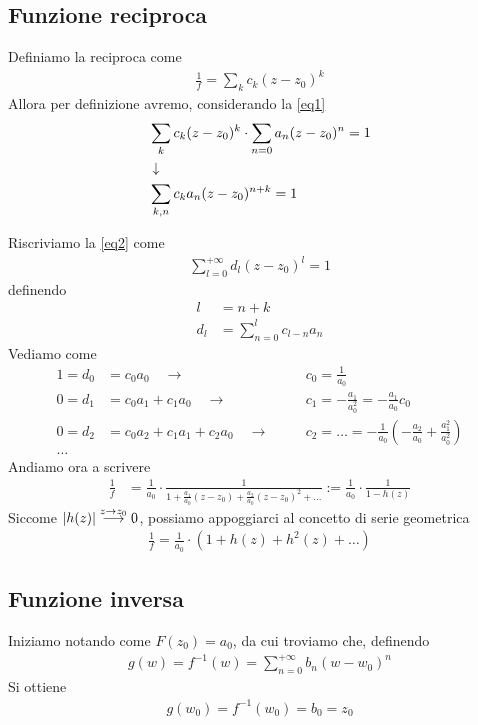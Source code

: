 \subsection{Funzione reciproca}

Definiamo la reciproca come
\begin{align}
	\frac{1}{f} = \sum_{k} c_k (z-z_0)^k
\end{align}
Allora per definizione avremo, considerando la \ref{eq1}
\begin{align}
	&\sum_{k} c_k (z-z_0)^k \cdot \sum_{n=0} a_n (z-z_0)^n = 1\\ &\downarrow \nonumber \\
	&\sum_{k,n} c_ka_n (z-z_0)^{n+k} = 1 \label{eq2}
\end{align}

Riscriviamo la \ref{eq2} come
\begin{align}
	\sum_{l=0}^{+\infty} d_l (z-z_0)^l = 1
\end{align}
definendo
\begin{align}
	l &= n+k\\
	d_l &= \sum_{n=0}^{l}c_{l-n}a_n
\end{align}
Vediamo come
\begin{align}
	1 = d_0 &= c_0a_0 \quad \rightarrow& \quad &c_0 = \frac{1}{a_0}\\
	0 = d_1 &= c_0a_1 + c_1a_0 \quad \rightarrow& \quad &c_1 = -\frac{a_1}{a_0^2} = -\frac{a_1}{a_0} c_0\\
	0 = d_2 &= c_0a_2 + c_1a_1 + c_2a_0 \quad \rightarrow& \quad &c_2 = \dots = -\frac{1}{a_0}\left( -\frac{a_2}{a_0} + \frac{a_1^2}{a_0^2} \right) \\
	\dots \nonumber
\end{align}
Andiamo ora a scrivere
\begin{align}
	\frac{1}{f} &= \frac{1}{a_0}\cdot \frac{1}{1 + \frac{a_1}{a_0}(z-z_0) + \frac{a_2}{a_0} (z-z_0)^2 + \dots} := \frac{1}{a_0} \cdot \frac{1}{1-h(z)}
\end{align}
Siccome $|h(z)| \overset{z \rightarrow z_0}{\longrightarrow} 0$, possiamo appoggiarci al concetto di serie geometrica
\begin{align}
	\frac{1}{f} = \frac{1}{a_0}\cdot (1 + h(z) + h^2(z) + \dots)
\end{align}

\subsection{Funzione inversa}

Iniziamo notando come $F(z_0) = a_0$, da cui troviamo che, definendo
\begin{align}
	g(w) = f^{-1}(w) = \sum_{n=0}^{+\infty} b_n(w-w_0)^n
\end{align}
Si ottiene
\begin{align}
	g(w_0) = f^{-1}(w_0) = b_0 = z_0
\end{align}

